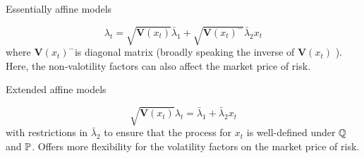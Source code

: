 \begin{description}
  \item[ Essentially affine models]
\end{description}
\[
\lambda_{t}=\sqrt{\boldsymbol{V}\left(x_{t}\right)} \bar{\lambda}_{1}+\sqrt{\boldsymbol{V}\left(x_{t}\right)^{-}} \bar{\lambda}_{2} x_{t}
\]
where $\boldsymbol{V}\left(x_{t}\right)^{-}$is diagonal matrix (broadly speaking the inverse of
$\boldsymbol{V}\left(x_{t}\right)$ ). Here, the non-valotility factors can also affect the market
price of risk.

\begin{description}
  \item[Extended affine models]
\end{description}
\[
\sqrt{\boldsymbol{V}\left(x_{t}\right)} \lambda_{t}=\bar{\lambda}_{1}+\bar{\lambda}_{2} x_{t}
\]
with restrictions in $\bar{\lambda}_{2}$ to ensure that the process for $x_{t}$ is well-defined
under $\Q$ and $\P$. Offers more flexibility for the volatility factors on the market price of
risk.

